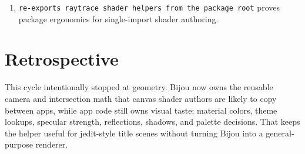 \begin{enumerate}
\item
  \texttt{r\allowbreak{}e\allowbreak{}-\allowbreak{}e\allowbreak{}x\allowbreak{}p\allowbreak{}o\allowbreak{}r\allowbreak{}t\allowbreak{}s\allowbreak{} \allowbreak{}r\allowbreak{}a\allowbreak{}y\allowbreak{}t\allowbreak{}r\allowbreak{}a\allowbreak{}c\allowbreak{}e\allowbreak{} \allowbreak{}s\allowbreak{}h\allowbreak{}a\allowbreak{}d\allowbreak{}e\allowbreak{}r\allowbreak{} \allowbreak{}h\allowbreak{}e\allowbreak{}l\allowbreak{}p\allowbreak{}e\allowbreak{}r\allowbreak{}s\allowbreak{} \allowbreak{}f\allowbreak{}r\allowbreak{}o\allowbreak{}m\allowbreak{} \allowbreak{}t\allowbreak{}h\allowbreak{}e\allowbreak{} \allowbreak{}p\allowbreak{}a\allowbreak{}c\allowbreak{}k\allowbreak{}a\allowbreak{}g\allowbreak{}e\allowbreak{} \allowbreak{}r\allowbreak{}o\allowbreak{}o\allowbreak{}t} proves package ergonomics for single-import shader authoring.
\end{enumerate}

\section{Retrospective}\label{record-159-retrospective}

This cycle intentionally stopped at geometry. Bijou now owns the reusable camera and intersection math that canvas shader authors are likely to copy between apps, while app code still owns visual taste: material colors, theme lookups, specular strength, reflections, shadows, and palette decisions. That keeps the helper useful for jedit-style title scenes without turning Bijou into a general-purpose renderer.

